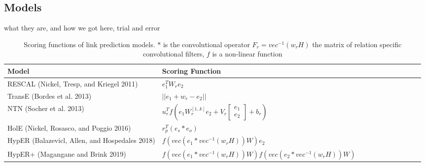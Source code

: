 \subsection{Models}
what they are, and how we got here, trial and error
\begin{table}[H]
\centering
\begin{tabular}{lllllllllll}
  \textbf{Model} & \textbf{Scoring Function} \\
  \hline
  RESCAL (Nickel, Tresp, and Kriegel 2011) & $e^T_1W_r e_2$  \\
  TransE (Bordes et al. 2013) & $|| e_1 + w_r - e_2 ||$ \\
  NTN (Socher et al. 2013) & $u^T_r f(e_1W_r^{[1..k]} e_2 + V_r \begin{bmatrix}e_1 \\ e_2\end{bmatrix} + b_r)$ \\
  HolE (Nickel, Rosasco, and Poggio 2016) & $r^T_p(e_s * e_o)$ \\
  HypER (Balazevicl, Allen, and Hospedales 2018) & $f(vec(e_1 * vec^{-1}(w_rH))W)e_2$ \\
  HypER+ (Magangane and Brink 2019) & $f(vec(e_1 * vec^{-1}(w_rH))W)f(vec(e_2 * vec^{-1}(w_rH))W)$
\end{tabular}
 \caption {Scoring functions of link prediction models. $*$ is the convolutional operator $F_r = vec^{-1}(w_rH)$ the matrix of relation specific convolutional filters, $f$ is a non-linear function}
\end{table}

